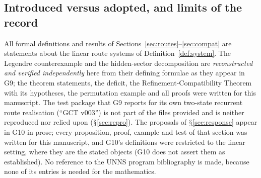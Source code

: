 \documentclass[11pt,a4paper]{article}
\renewcommand{\S}{\ensuremath{\mathsection}}
\theoremstyle{plain}
\theoremstyle{definition}
\begin{document}
\subsection{Introduced versus adopted, and limits of the record}
All formal definitions and results of Sections~\ref{sec:routes}--\ref{sec:compat} are statements about the linear route systems of Definition~\ref{def:system}. The Legendre counterexample and the hidden-sector decomposition are \emph{reconstructed and verified independently} here from their defining formulae as they appear in G9; the theorem statements, the deficit, the Refinement-Compatibility Theorem with its hypotheses, the permutation example and all proofs were written for this manuscript. The test package that G9 reports for its own two-state recurrent route realisation (``GCT v003'') is not part of the files provided and is neither reproduced nor relied upon (\S\ref{sec:repro}). The proposals of \S\ref{sec:response} appear in G10 in prose; every proposition, proof, example and test of that section was written for this manuscript, and G10's definitions were restricted to the linear setting, where they are the stated objects (G10 does not assert them as established). No reference to the UNNS program bibliography is made, because none of its entries is needed for the mathematics.
\end{document}
